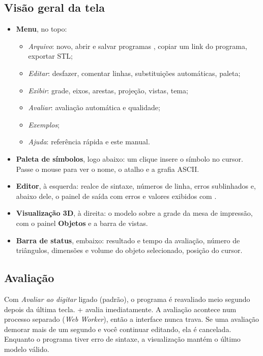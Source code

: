 \subsection{Visão geral da tela}
\begin{itemize}
  \item \textbf{Menu}, no topo:
    \begin{itemize}
      \item \emph{Arquivo}: novo, abrir e salvar programas , copiar um link do programa, exportar STL;
      \item \emph{Editar}: desfazer, comentar linhas, substituições automáticas, paleta;
      \item \emph{Exibir}: grade, eixos, arestas, projeção, vistas, tema;
      \item \emph{Avaliar}: avaliação automática e qualidade;
      \item \emph{Exemplos};
      \item \emph{Ajuda}: referência rápida e este manual.
    \end{itemize}
  \item \textbf{Paleta de símbolos}, logo abaixo: um clique insere o símbolo no cursor. Passe o mouse para ver o nome, o atalho e a grafia ASCII.
  \item \textbf{Editor}, à esquerda: realce de sintaxe, números de linha, erros sublinhados e, abaixo dele, o painel de saída com erros e valores exibidos com .
  \item \textbf{Visualização 3D}, à direita: o modelo sobre a grade da mesa de impressão, com o painel \textbf{Objetos} e a barra de vistas.
  \item \textbf{Barra de status}, embaixo: resultado e tempo da avaliação, número de triângulos, dimensões e volume do objeto selecionado, posição do cursor.
\end{itemize}

\subsection{Avaliação}
Com \emph{Avaliar ao digitar} ligado (padrão), o programa é reavaliado meio segundo depois da última tecla.
+ avalia imediatamente. A avaliação acontece num processo separado (\emph{Web Worker}), então
a interface nunca trava. Se uma avaliação demorar mais de um segundo e você continuar editando, ela é cancelada.
Enquanto o programa tiver erro de sintaxe, a visualização mantém o último modelo válido.

